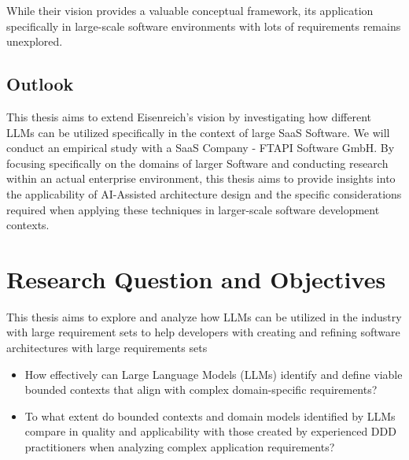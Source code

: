 While their vision provides a valuable conceptual framework, its application specifically in large-scale software environments with lots of requirements remains unexplored. 

\subsection{Outlook}
This thesis aims to extend Eisenreich's vision by investigating how different LLMs can be utilized specifically in the context of large SaaS Software. We will conduct an empirical study with a SaaS Company - FTAPI Software GmbH. By focusing specifically on the domains of larger Software and conducting research within an actual enterprise environment, this thesis aims to provide insights into the applicability of AI-Assisted architecture design and the specific considerations required when applying these techniques in larger-scale software development contexts.

\section{Research Question and Objectives}

This thesis aims to explore and analyze how LLMs can be utilized in the industry with large requirement sets to help developers with creating and refining software architectures with large requirements sets

\begin{itemize}
    \item How effectively can Large Language Models (LLMs) identify and define viable bounded contexts that align with complex domain-specific requirements?
    \item To what extent do bounded contexts and domain models identified by LLMs compare in quality and applicability with those created by experienced DDD practitioners when analyzing complex application requirements?
\end{itemize}